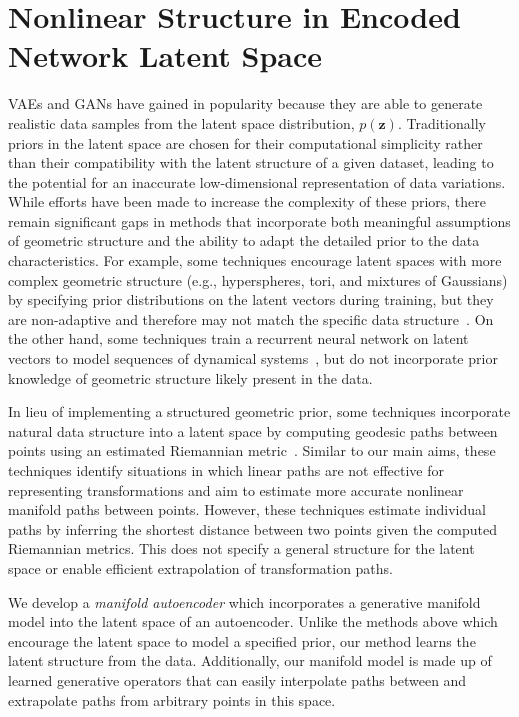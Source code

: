 \documentclass[letterpaper]{article} %
\newcommand{\vtr}[1]{\ensuremath{\mathbf{#1}}}
\begin{document}
\section{Nonlinear Structure in Encoded Network Latent Space}\label{sec:background}
VAEs and GANs have gained in popularity because they are able to generate realistic data samples from the latent space distribution, $p(\vtr{z})$. Traditionally priors in the latent space are chosen for their computational simplicity rather than their compatibility with the latent structure of a given dataset, leading to the potential for an inaccurate low-dimensional representation of data variations. While efforts have been made to increase the complexity of these priors, there remain significant gaps in methods that incorporate both meaningful assumptions of geometric structure and the ability to adapt the detailed prior to the data characteristics. For example, some techniques encourage latent spaces with more complex geometric structure (e.g., hyperspheres, tori, and mixtures of Gaussians) by specifying prior distributions on the latent vectors during training, but they are non-adaptive and therefore may not match the specific data structure~\cite{tomczak2017vae,davidson2018hyperspherical,makhzani2015adversarial,falorsi2018explorations,rey2019diffusion}. On the other hand, some techniques train a recurrent neural network on latent vectors to model sequences of dynamical systems~\cite{sussillo2016lfads}, but do not incorporate prior knowledge of geometric structure likely present in the data. 


In lieu of implementing a structured geometric prior, some techniques incorporate natural data structure into a latent space by computing geodesic paths between points using an estimated Riemannian metric~\cite{arvanitidis2017latent,chen2017metrics,shao2018riemannian}. Similar to our main aims, these techniques identify situations in which linear paths are not effective for representing transformations and aim to estimate more accurate nonlinear manifold paths between points. However, these techniques estimate individual paths by inferring the shortest distance between two points given the computed Riemannian metrics. This does not specify a general structure for the latent space or enable efficient extrapolation of transformation paths. 

We develop a \textit{manifold autoencoder} which incorporates a generative manifold model into the latent space of an autoencoder. Unlike the methods above which encourage the latent space to model a specified prior, our method learns the latent structure from the data. Additionally, our manifold model is made up of learned generative operators that can easily interpolate paths between and extrapolate paths from arbitrary points in this space. 
\end{document}
